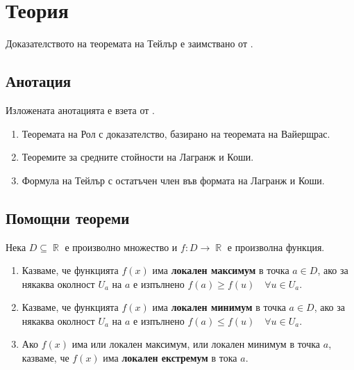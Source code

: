 \documentclass{../../common/topic}
\begin{document}
\maketitle

\section{Теория}

Доказателството на теоремата на Тейлър е заимствано от \cite{Фихтенгольц1968Том2}.

\subsection{Анотация}

Изложената анотацията е взета от \cite{Syllabus}.

\begin{enumerate}
  \item Теоремата на Рол с доказателство, базирано на теоремата на Вайерщрас.
  \item Теоремите за средните стойности на Лагранж и Коши.
  \item Формула на Тейлър с остатъчен член във формата на Лагранж и Коши.
\end{enumerate}

\subsection{Помощни теореми}

\begin{definition}
  Нека \( D \subseteq \BbbR \) е произволно множество и \( f: D \to \BbbR \) е произволна функция.

  \begin{enumerate}
    \item Казваме, че функцията \( f(x) \) има \textbf{локален максимум} в точка \( a \in D \), ако за някаква околност \( U_a \) на \( a \) е изпълнено \( f(a) \geq f(u)\quad\forall u \in U_a \).

    \item Казваме, че функцията \( f(x) \) има \textbf{локален минимум} в точка \( a \in D \), ако за някаква околност \( U_a \) на \( a \) е изпълнено \( f(a) \leq f(u)\quad\forall u \in U_a \).

    \item Ако \( f(x) \) има или локален максимум, или локален минимум в точка \( a \), казваме, че \( f(x) \) има \textbf{локален екстремум} в тока \( a \).
  \end{enumerate}
\end{definition}
\end{document}
